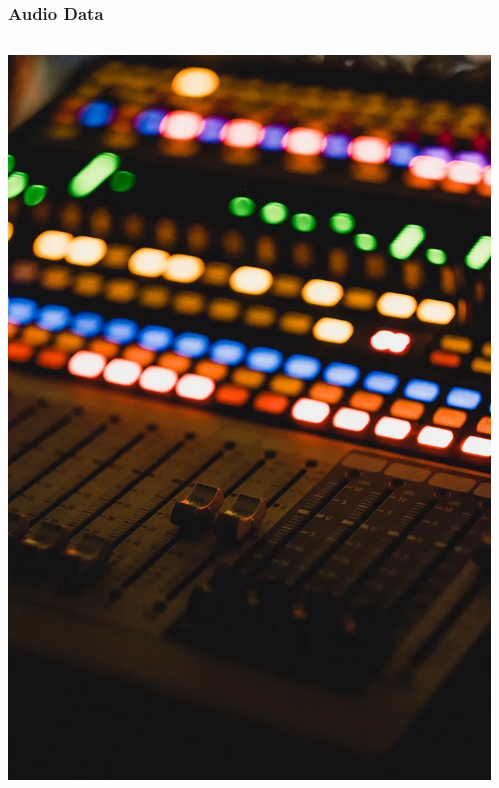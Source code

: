 \documentclass[aspectratio=169, 11pt]{beamer}
\begin{document}
\begin{frame}
  \frametitle{Audio Data}
  \begin{columns}
    \begin{column}{0.27\textwidth}
      \includegraphics[width=\textwidth]{image/audio2.png}
    \end{column}
    \begin{column}{0.33\textwidth}

\end{column}
\end{columns}
\end{frame}
\end{document}
